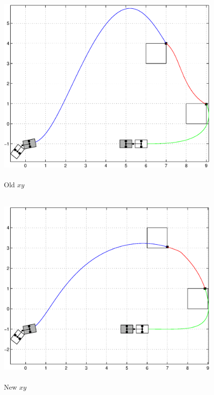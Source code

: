 \documentclass[12pt,a4paper]{article}
\theoremstyle{break}
\begin{document}
\begin{figure}[t]
  \begin{center}
    \includegraphics[height=10cm]{xy_old.eps}
    \caption{Old $xy$}
    \label{fig:xy_old}
  \end{center}
\end{figure}

\begin{figure}[t]
  \begin{center}
    \includegraphics[height=10cm]{xy_new.eps}
    \caption{New $xy$}
    \label{fig:xy_new}
  \end{center}
\end{figure}

\end{document}
